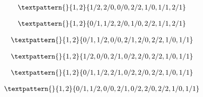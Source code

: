 \begin{equation}
	\begin{gathered}
		\textpattern{}{1,2}{1/2,2/0,0/0,2/2,1/0,1/1,2/1}
	\end{gathered}
	\label{cls:214}
\end{equation}

\begin{equation}
	\begin{gathered}
		\textpattern{}{1,2}{0/1,1/2,2/0,1/0,2/2,1/1,2/1}
	\end{gathered}
	\label{cls:215}
\end{equation}

\begin{equation}
	\begin{gathered}
		\textpattern{}{1,2}{0/1,1/2,0/0,2/1,2/0,2/2,1/0,1/1}
	\end{gathered}
	\label{cls:216}
\end{equation}

\begin{equation}
	\begin{gathered}
		\textpattern{}{1,2}{1/2,0/0,2/1,0/2,2/0,2/2,1/0,1/1}
	\end{gathered}
	\label{cls:217}
\end{equation}

\begin{equation}
	\begin{gathered}
		\textpattern{}{1,2}{0/1,1/2,2/1,0/2,2/0,2/2,1/0,1/1}
	\end{gathered}
	\label{cls:218}
\end{equation}

\begin{equation}
	\begin{gathered}
		\textpattern{}{1,2}{0/1,1/2,0/0,2/1,0/2,2/0,2/2,1/0,1/1}
	\end{gathered}
	\label{cls:219}
\end{equation}

